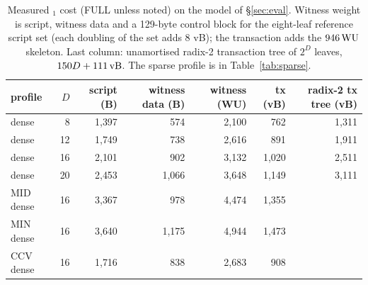 
\begin{table}[htbp]
\centering
\caption{Measured $_1$ cost (FULL unless noted) on the model of \S\ref{sec:eval}. Witness weight is script, witness data and a 129-byte control block for the eight-leaf reference script set (each doubling of the set adds 8 vB); the transaction adds the $946\,\mathrm{WU}$ skeleton. Last column: unamortised radix-2 transaction tree of $2^D$ leaves, $150D + 111\,\mathrm{vB}$. The sparse profile is in Table~\ref{tab:sparse}.}
\label{tab:sizes}
\setlength{\tabcolsep}{3.5pt}\scriptsize
\begin{tabular}{@{}lrrrrrr@{}}
\toprule
profile & $D$ & script (B) & witness data (B) & witness (WU) & tx (vB) & radix-2 tx tree (vB) \\
\midrule
dense & 8 & 1{,}397 & 574 & 2{,}100 & 762 & 1{,}311 \\
dense & 12 & 1{,}749 & 738 & 2{,}616 & 891 & 1{,}911 \\
dense & 16 & 2{,}101 & 902 & 3{,}132 & 1{,}020 & 2{,}511 \\
dense & 20 & 2{,}453 & 1{,}066 & 3{,}648 & 1{,}149 & 3{,}111 \\
\midrule
MID dense & 16 & 3{,}367 & 978 & 4{,}474 & 1{,}355 & \\
MIN dense & 16 & 3{,}640 & 1{,}175 & 4{,}944 & 1{,}473 & \\
CCV dense & 16 & 1{,}716 & 838 & 2{,}683 & 908 & \\
\bottomrule
\end{tabular}
\end{table}
